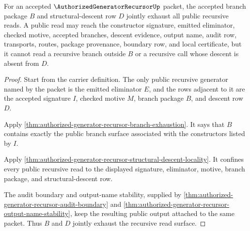 \begin{theorem}
\label{thm:authorized-generator-recursor-branch-descent-totality}
For an accepted $\AuthorizedGeneratorRecursorUp$ packet, the accepted branch package $B$ and structural-descent row $D$ jointly exhaust all public recursive reads. A public read may reach the constructor signature, emitted eliminator, checked motive, accepted branches, descent evidence, output name, audit row, transports, routes, package provenance, boundary row, and local certificate, but it cannot read a recursive branch outside $B$ or a recursive call whose descent is absent from $D$.
\end{theorem}
\begin{proof}
Start from the carrier definition. The only public recursive generator named by the packet is the emitted eliminator $E$, and the rows adjacent to it are the accepted signature $I$, checked motive $M$, branch package $B$, and descent row $D$.

Apply \autoref{thm:authorized-generator-recursor-branch-exhaustion}. It says that $B$ contains exactly the public branch surface associated with the constructors listed by $I$.

Apply \autoref{thm:authorized-generator-recursor-structural-descent-locality}. It confines every public recursive read to the displayed signature, eliminator, motive, branch package, and structural-descent row.

The audit boundary and output-name stability, supplied by \autoref{thm:authorized-generator-recursor-audit-boundary} and \autoref{thm:authorized-generator-recursor-output-name-stability}, keep the resulting public output attached to the same packet. Thus $B$ and $D$ jointly exhaust the recursive read surface.
\end{proof}

